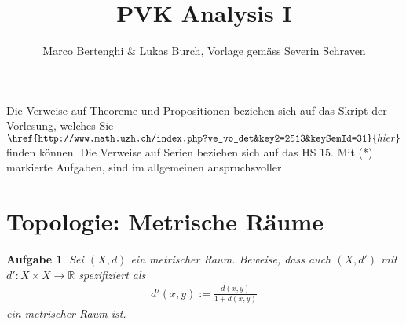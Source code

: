 \documentclass[a4paper, 20]{exam}
\newtheorem{ex}{Aufgabe}
\begin{document}
\title{PVK Analysis I}
\author{Marco Bertenghi \& Lukas Burch, Vorlage gemäss Severin Schraven}
\maketitle

Die Verweise auf Theoreme und Propositionen beziehen sich auf das Skript der Vorlesung, welches Sie $\href{http://www.math.uzh.ch/index.php?ve_vo_det&key2=2513&keySemId=31}{hier}$ finden k\"onnen. Die Verweise auf Serien beziehen sich auf das HS 15. Mit (*) markierte Aufgaben, sind im allgemeinen anspruchsvoller.




\section{Topologie: Metrische Räume}
\begin{ex} Sei $(X,d)$ ein metrischer Raum. Beweise, dass auch $(X,d')$ mit  $d': X \times X \to \mathbb{R}$ spezifiziert als 
\begin{align*}
d'(x,y):= \frac{d(x,y)}{1+d(x,y)}
\end{align*}
ein metrischer Raum ist.
\end{ex}
\end{document}
